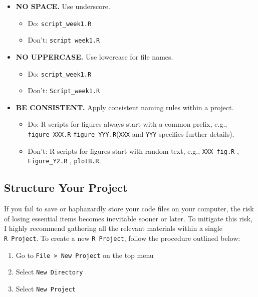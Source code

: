 \documentclass[
]{book}
\providecommand{\tightlist}{%
  \setlength{\itemsep}{0pt}\setlength{\parskip}{0pt}}
\begin{document}
\begin{itemize}
\tightlist
\item
  \textbf{NO SPACE.} Use underscore.

  \begin{itemize}
  \tightlist
  \item
    Do: \texttt{script\_week1.R}
  \item
    Don't: \texttt{script\ week1.R}
  \end{itemize}
\item
  \textbf{NO UPPERCASE.} Use lowercase for file names.

  \begin{itemize}
  \tightlist
  \item
    Do: \texttt{script\_week1.R}
  \item
    Don't: \texttt{Script\_week1.R}
  \end{itemize}
\item
  \textbf{BE CONSISTENT.} Apply consistent naming rules within a project.

  \begin{itemize}
  \tightlist
  \item
    Do: R scripts for figures always start with a common prefix, e.g., \texttt{figure\_XXX.R} \texttt{figure\_YYY.R}(\texttt{XXX} and \texttt{YYY} specifies further details).
  \item
    Don't: R scripts for figures start with random text, e.g., \texttt{XXX\_fig.R} , \texttt{Figure\_Y2.R} , \texttt{plotB.R}.
  \end{itemize}
\end{itemize}

\hypertarget{structure-your-project}{%
\subsection{Structure Your Project}\label{structure-your-project}}

If you fail to save or haphazardly store your code files on your computer, the risk of losing essential items becomes inevitable sooner or later. To mitigate this risk, I highly recommend gathering all the relevant materials within a single \texttt{R\ Project}. To create a new \texttt{R\ Project}, follow the procedure outlined below:

\begin{enumerate}
\def\labelenumi{\alph{enumi}.}
\tightlist
\item
  Go to \texttt{File\ \textgreater{}\ New\ Project} on the top menu
\item
  Select \texttt{New\ Directory}
\item
  Select \texttt{New\ Project}
\end{enumerate}
\end{document}
